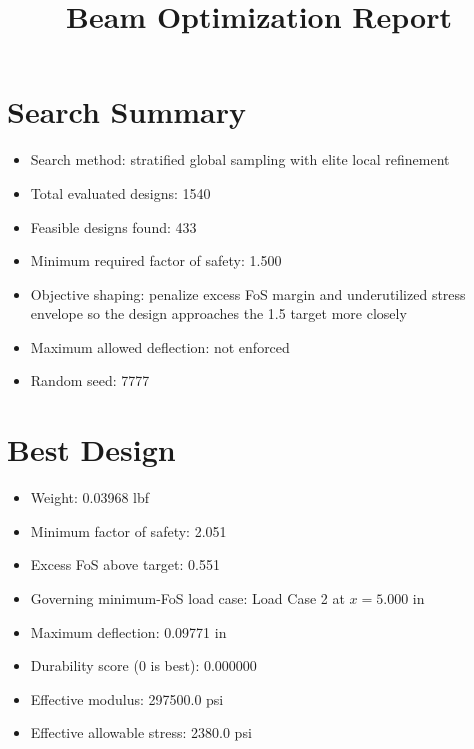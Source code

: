 \documentclass[11pt]{article}
\title{Beam Optimization Report}
\date{}
\begin{document}
\maketitle

\section*{Search Summary}
\begin{itemize}
\item Search method: stratified global sampling with elite local refinement
\item Total evaluated designs: 1540
\item Feasible designs found: 433
\item Minimum required factor of safety: 1.500
\item Objective shaping: penalize excess FoS margin and underutilized stress envelope so the design approaches the 1.5 target more closely
\item Maximum allowed deflection: not enforced
\item Random seed: 7777
\end{itemize}

\section*{Best Design}
\begin{itemize}
\item Weight: 0.03968 lbf
\item Minimum factor of safety: 2.051
\item Excess FoS above target: 0.551
\item Governing minimum-FoS load case: Load Case 2 at $x=5.000$ in
\item Maximum deflection: 0.09771 in
\item Durability score (0 is best): 0.000000
\item Effective modulus: 297500.0 psi
\item Effective allowable stress: 2380.0 psi
\end{itemize}
\end{document}
